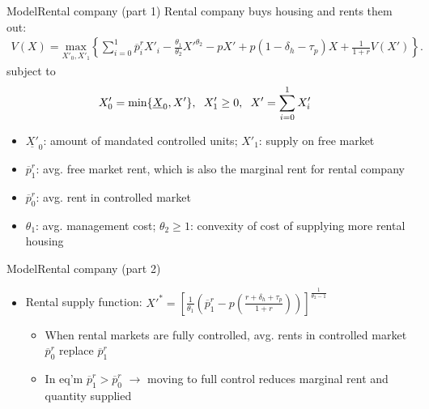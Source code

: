 \documentclass[11pt,aspectratio=169]{beamer}
\begin{document}
\begin{frame}{Model}{Rental company (part 1)}
Rental company buys housing and rents them out:
\begin{align}\label{eq:rental_company_problem}
V(X)=\underset{X'_{0},X'_{1}} {\text{$\mbox{max} $}}\left\{\sum_{i=0}^{1} \overline{p}^{r}_{i}X'_{i}-\frac{\theta_{1}}{\theta_{2}}X'^{\theta_{2}}-p X'+p(1-\delta_{h}-\tau_{p})X+\frac{1}{1+r}V(X')\right\}.
\end{align}
subject to
\begin{align*}
& X'_{0}=\mbox{min}\{\underline{X}_{0},X'\}, \hspace{0.2cm} X'_{1} \geq 0, \hspace{0.2cm} X'=\sum^{1}_{i=0} X'_{i}
\end{align*}

\begin{itemize}
    \item $\underline{X'}_{0}$: amount of mandated controlled units; $X'_{1}$: supply on free market
    \item $\overline{p}^{r}_{1}$: avg. free market rent, which is also the marginal rent for rental company
    \item $\overline{p}^{r}_{0}$: avg. rent in controlled market
    \item $\theta_{1}$: avg. management cost; $\theta_{2} \geq 1$: convexity of cost of supplying more rental housing
\end{itemize}

\end{frame}

\begin{frame}{Model}{Rental company (part 2)}

\begin{itemize}
    \item Rental supply function:
    $X'^{*}=\left[\frac{1}{\theta_{1}}\left(\overline{p}^{r}_{1}-p\left(\frac{r+\delta_{h}+\tau_{p}}{1+r}\right)\right)\right]^{\frac{1}{\theta_{2}-1}}$
    \begin{itemize}
        \item When rental markets are fully controlled, avg. rents in controlled market $\overline{p}^{r}_{0}$ replace $\overline{p}^{r}_{1}$
        \item In eq'm $\overline{p}^{r}_{1}>\overline{p}^{r}_{0}$ $\rightarrow$ moving to full control reduces marginal rent and quantity supplied
    \end{itemize}
\end{itemize}

\end{frame}
\end{document}
